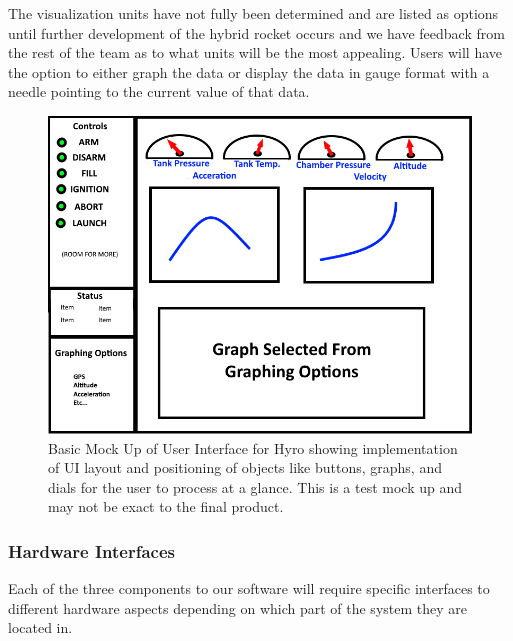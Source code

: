 \documentclass[10pt,draftclsnofoot,onecolumn,retainorgcmds]{IEEEtran}
\begin{document}
The visualization units have not fully been determined and are listed as options until further development of the hybrid rocket occurs and we have feedback from the rest of the team as to what units will be the most appealing. Users will have the option to either graph the data or display the data in gauge format with a needle pointing to the current value of that data. \par


\begin{figure}
	\caption{Basic Mock Up of User Interface for Hyro showing implementation of UI layout and positioning of objects like buttons, graphs, and dials for the user to process at a glance. This is a test mock up and may not be exact to the final product. }
	\centering
	\includegraphics[scale=.75]{HyRoUIMockup}
\end{figure}
\FloatBarrier
\subsubsection{Hardware Interfaces}
Each of the three components to our software will require specific interfaces to different hardware aspects depending on which part of the system they are located in.\par
\end{document}
